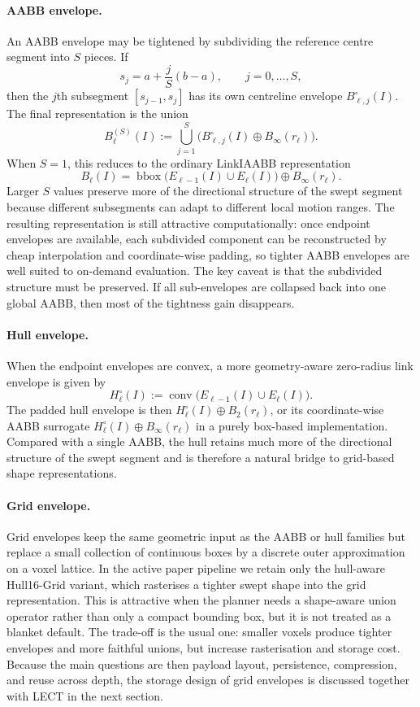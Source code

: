 \documentclass[journal]{IEEEtran}
\begin{document}
\paragraph{AABB envelope.}
An AABB envelope may be tightened by subdividing the reference centre segment
into $S$ pieces. If
\[
s_j = a + \frac{j}{S}(b-a), \qquad j=0,\dots,S,
\]
then the $j$th subsegment $[s_{j-1},s_j]$ has its own centreline envelope
$B^{\circ}_{\ell,j}(I)$. The final representation is the union
\[
B^{(S)}_\ell(I) := \bigcup_{j=1}^{S}
\bigl(B^{\circ}_{\ell,j}(I) \oplus B_\infty(r_\ell)\bigr).
\]
When $S=1$, this reduces to the ordinary LinkIAABB representation
\[
B_\ell(I) = \operatorname{bbox}\bigl(E_{\ell-1}(I) \cup E_\ell(I)\bigr)
\oplus B_\infty(r_\ell).
\]
Larger $S$ values preserve more of the directional structure of the swept
segment because different subsegments can adapt to different local motion
ranges. The resulting representation is still attractive computationally:
once endpoint envelopes are available, each subdivided component can be
reconstructed by cheap interpolation and coordinate-wise padding, so tighter
AABB envelopes are well suited to on-demand evaluation. The key caveat is that
the subdivided structure must be preserved. If all sub-envelopes are collapsed
back into one global AABB, then most of the tightness gain disappears.

\paragraph{Hull envelope.}
When the endpoint envelopes are convex, a more geometry-aware zero-radius link
envelope is given by
\[
H_\ell^{\circ}(I) := \operatorname{conv}\bigl(E_{\ell-1}(I) \cup E_\ell(I)\bigr).
\]
The padded hull envelope is then $H_\ell^{\circ}(I) \oplus B_2(r_\ell)$, or its
coordinate-wise AABB surrogate
$H_\ell^{\circ}(I) \oplus B_\infty(r_\ell)$ in a purely box-based
implementation. Compared with a single AABB, the hull retains much more of the
directional structure of the swept segment and is therefore a natural bridge to
grid-based shape representations.

\paragraph{Grid envelope.}
Grid envelopes keep the same geometric input as the AABB or hull families but
replace a small collection of continuous boxes by a discrete outer
approximation on a voxel lattice. In the active paper pipeline we retain only
the hull-aware Hull16-Grid variant, which rasterises a tighter swept shape into
the grid representation. This is attractive when the planner needs a
shape-aware union operator rather than only a compact bounding box, but it is
not treated as a blanket default. The trade-off is the usual one: smaller
voxels produce tighter envelopes and more faithful unions, but increase
rasterisation and storage cost. Because the main questions are then payload
layout, persistence, compression, and reuse across depth, the storage design of
grid envelopes is discussed together with LECT in the next section.
\end{document}
